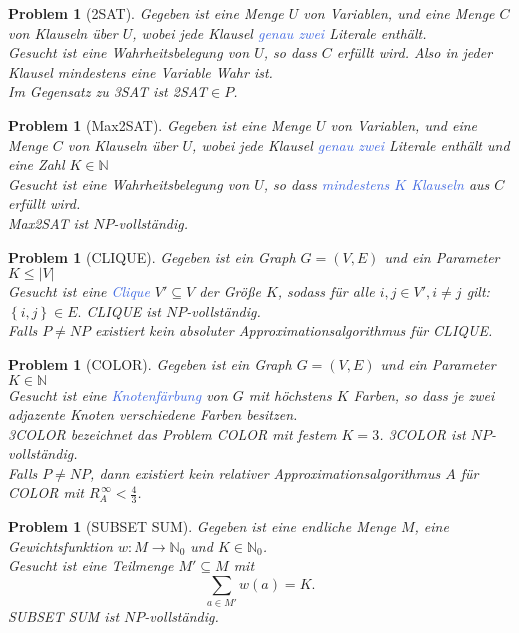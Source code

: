 \documentclass[11pt]{article}
\newcommand{\tcol}[1]{\textcolor{RoyalBlue}{#1}}
\newcommand{\set}[1]{\left\lbrace #1\right\rbrace}
\theoremstyle{break}
\newtheorem{prob}[satz]{Problem}
\begin{document}
\begin{prob}[2SAT]
Gegeben ist eine Menge $U$ von Variablen, und eine Menge $C$ von Klauseln über $U$, wobei jede Klausel \tcol{genau zwei} Literale enthält.\\
Gesucht ist eine Wahrheitsbelegung von $U$, so dass $C$ erfüllt wird. Also in jeder Klausel mindestens eine Variable Wahr ist.\\
Im Gegensatz zu 3SAT ist 2SAT$\in P$.
\end{prob}

\begin{prob}[Max2SAT]
Gegeben ist eine Menge $U$ von Variablen, und eine Menge $C$ von Klauseln über $U$, wobei jede Klausel \tcol{genau zwei} Literale enthält und eine Zahl $K\in\mathbb{N}$\\
Gesucht ist eine Wahrheitsbelegung von $U$, so dass \tcol{mindestens $K$ Klauseln} aus $C$ erfüllt wird.\\
Max2SAT ist $NP$-vollständig.
\end{prob}

\begin{prob}[CLIQUE]
Gegeben ist ein Graph $G=(V,E)$ und ein Parameter $K\leq |V|$\\
Gesucht ist eine \tcol{Clique} $V'\subseteq V$ der Größe $K$, sodass für alle $i,j\in V', i\neq j$ gilt: $\set{i,j}\in E.$
CLIQUE ist $NP$-vollständig.\\
Falls $P\neq NP$ existiert kein absoluter Approximationsalgorithmus für CLIQUE.
\end{prob}

\begin{prob}[COLOR]
Gegeben ist ein Graph $G=(V,E)$ und ein Parameter $K\in\mathbb{N}$\\
Gesucht ist eine \tcol{Knotenfärbung} von $G$ mit höchstens $K$ Farben, so dass je zwei adjazente Knoten verschiedene Farben besitzen.\\
3COLOR bezeichnet das Problem COLOR mit festem $K=3$. 3COLOR ist $NP$-vollständig.\\
Falls $P\neq NP$, dann existiert kein relativer Approximationsalgorithmus $A$ für COLOR mit $R^{\,\infty}_A<\frac{4}{3}$.
\end{prob}

\begin{prob}[SUBSET SUM]
Gegeben ist eine endliche Menge $M$, eine Gewichtsfunktion $w\colon M\to\mathbb{N}_0$ und $K\in\mathbb{N}_0$.\\
Gesucht ist eine Teilmenge $M'\subseteq M$ mit
\[\sum_{a\in M'}w(a)=K.\]
SUBSET SUM ist $NP$-vollständig.
\end{prob}
\end{document}
